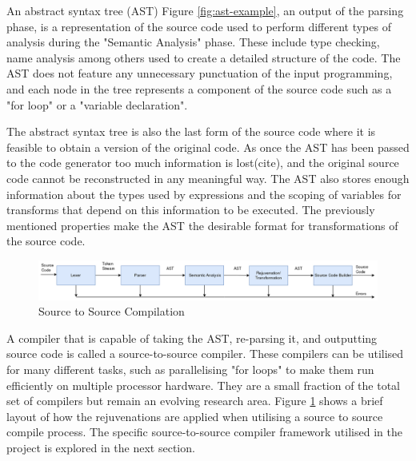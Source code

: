 \documentclass[bsc,frontabs,singlespacing,twoside,parskip,deptreport]{infthesis}
\begin{document}
An abstract syntax tree (AST) Figure \ref{fig:ast-example}, an output of the parsing phase, is a representation of the source code used to perform different types of analysis during the "Semantic Analysis" phase. These include type checking, name analysis among others used to create a detailed structure of the code. The AST does not feature any unnecessary punctuation of the input programming, and each node in the tree represents a component of the source code such as a "for loop" or a "variable declaration".


The abstract syntax tree is also the last form of the source code where it is feasible to obtain a version of the original code. As once the AST has been passed to the code generator too much information is lost(cite), and the original source code cannot be reconstructed in any meaningful way. The AST also stores enough information about the types used by expressions and the scoping of variables for transforms that depend on this information to be executed. The previously mentioned properties make the AST the desirable format for transformations of the source code. 

\begin{figure}[!h]
    \centering
    \includegraphics[width=\textwidth]{images/Compilation-process-src.png}
    \caption{Source to Source Compilation}
    \label{fig:comp_proc_src}
\end{figure}

A compiler that is capable of taking the AST, re-parsing it, and outputting source code is called a source-to-source compiler. These compilers can be utilised for many different tasks, such as parallelising "for loops" to make them run efficiently on multiple processor hardware. They are a small fraction of the total set of compilers but remain an evolving research area. Figure \ref{fig:comp_proc_src} shows a brief layout of how the rejuvenations are applied when utilising a source to source compile process. The specific source-to-source compiler framework utilised in the project is explored in the next section.

\end{document}
